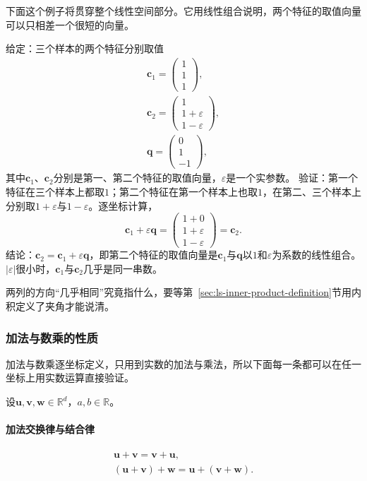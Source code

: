 下面这个例子将贯穿整个线性空间部分。它用线性组合说明，两个特征的取值向量可以只相差一个很短的向量。
\begin{example}
\label{ex:ls-nearly-collinear-features}
给定：三个样本的两个特征分别取值
\begin{equation*}
 \begin{gathered}
 \bm c_1=\begin{pmatrix}1\\1\\1\end{pmatrix},\\
 \bm c_2=\begin{pmatrix}1\\1+\varepsilon\\1-\varepsilon\end{pmatrix},\\
 \bm q=\begin{pmatrix}0\\1\\-1\end{pmatrix},
\end{gathered}
\end{equation*}
其中$\bm c_1$、$\bm c_2$分别是第一、第二个特征的取值向量，$\varepsilon$是一个实参数。
验证：第一个特征在三个样本上都取$1$；第二个特征在第一个样本上也取$1$，在第二、三个样本上分别取$1+\varepsilon$与$1-\varepsilon$。逐坐标计算，
\[
 \bm c_1+\varepsilon\bm q=\begin{pmatrix}1+0\\1+\varepsilon\\1-\varepsilon\end{pmatrix}=\bm c_2.
\]
结论：$\bm c_2=\bm c_1+\varepsilon\bm q$，即第二个特征的取值向量是$\bm c_1$与$\bm q$以$1$和$\varepsilon$为系数的线性组合。$|\varepsilon|$很小时，$\bm c_1$与$\bm c_2$几乎是同一串数。
\end{example}
两列的方向“几乎相同”究竟指什么，要等第~\ref{sec:ls-inner-product-definition}节用内积定义了夹角才能说清。

\subsubsection{加法与数乘的性质}
\label{sec:ls-vector-operation-rules}

加法与数乘逐坐标定义，只用到实数的加法与乘法，所以下面每一条都可以在任一坐标上用实数运算直接验证。

设$\bm u,\bm v,\bm w\in\mathbb R^d$，$a,b\in\mathbb R$。

\paragraph{加法交换律与结合律}
\[
 \begin{gathered}
 \bm u+\bm v=\bm v+\bm u,\\
 (\bm u+\bm v)+\bm w=\bm u+(\bm v+\bm w).
 \end{gathered}
\]

